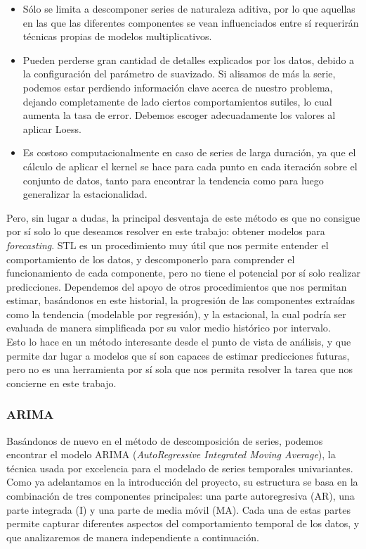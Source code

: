 \begin{itemize}
    \item Sólo se limita a descomponer series de naturaleza aditiva, por lo que aquellas en las que las diferentes componentes se vean influenciados entre sí requerirán técnicas propias de modelos multiplicativos.
    \item Pueden perderse gran cantidad de detalles explicados por los datos, debido a la configuración del parámetro de suavizado. Si alisamos de más la serie, podemos estar perdiendo información clave acerca de nuestro problema, dejando completamente de lado ciertos comportamientos sutiles, lo cual aumenta la tasa de error. Debemos escoger adecuadamente los valores al aplicar Loess.
    \item Es costoso computacionalmente en caso de series de larga duración, ya que el cálculo de aplicar el kernel se hace para cada punto en cada iteración sobre el conjunto de datos, tanto para encontrar la tendencia como para luego generalizar la estacionalidad.
\end{itemize}

Pero, sin lugar a dudas, la principal desventaja de este método es que no consigue por sí solo lo que deseamos resolver en este trabajo: obtener modelos para \textit{forecasting}. STL es un procedimiento muy útil que nos permite entender el comportamiento de los datos, y descomponerlo para comprender el funcionamiento de cada componente, pero no tiene el potencial por sí solo realizar predicciones. Dependemos del apoyo de otros procedimientos que nos permitan estimar, basándonos en este historial, la progresión de las componentes extraídas como la tendencia (modelable por regresión), y la estacional, la cual podría ser evaluada de manera simplificada por su valor medio histórico por intervalo.\\

Esto lo hace en un método interesante desde el punto de vista de análisis, y que permite dar lugar a modelos que sí son capaces de estimar predicciones futuras, pero no es una herramienta por sí sola que nos permita resolver la tarea que nos concierne en este trabajo.

\subsubsection{ARIMA}

Basándonos de nuevo en el método de descomposición de series, podemos encontrar el modelo ARIMA (\textit{AutoRegressive Integrated Moving Average}), la técnica usada por excelencia para el modelado de series temporales univariantes. Como ya adelantamos en la introducción del proyecto, su estructura se basa en la combinación de tres componentes principales: una parte autoregresiva (AR), una parte integrada (I) y una parte de media móvil (MA). Cada una de estas partes permite capturar diferentes aspectos del comportamiento temporal de los datos, y que analizaremos de manera independiente a continuación.

